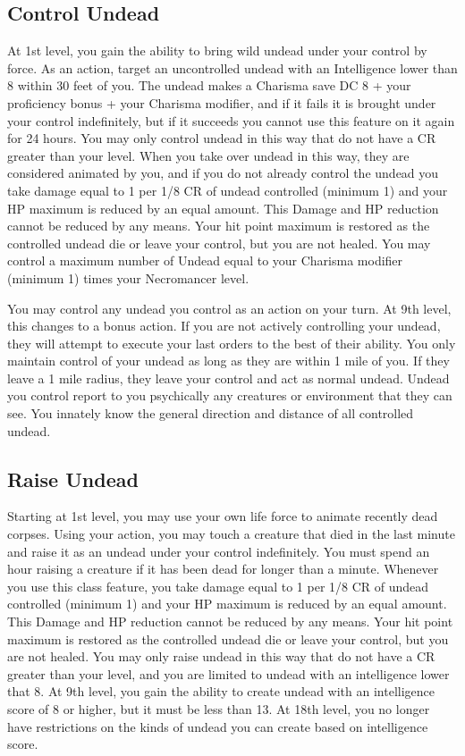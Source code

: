 \subsection{Control Undead}
At 1st level, you gain the ability to bring wild undead under your control by force. As an action, target an uncontrolled undead with an Intelligence lower than 8 within 30 feet of you. The undead makes a Charisma save DC 8 + your proficiency bonus + your Charisma modifier, and if it fails it is brought under your control indefinitely, but if it succeeds you cannot use this feature on it again for 24 hours. You may only control undead in this way that do not have a CR greater than your level. When you take over undead in this way, they are considered animated by you, and if you do not already control the undead you take damage equal to 1 per 1/8 CR of undead controlled (minimum 1) and your HP maximum is reduced by an equal amount. This Damage and HP reduction cannot be reduced by any means. Your hit point maximum is restored as the controlled undead die or leave your control, but you are not healed. You may control a maximum number of Undead equal to your Charisma modifier (minimum 1) times your Necromancer level.

You may control any undead you control as an action on your turn. At 9th level, this changes to a bonus action. If you are not actively controlling your undead, they will attempt to execute your last orders to the best of their ability. You only maintain control of your undead as long as they are within 1 mile of you. If they leave a 1 mile radius, they leave your control and act as normal undead.
Undead you control report to you psychically any creatures or environment that they can see. You innately know the general direction and distance of all controlled undead.

\subsection{Raise Undead}
Starting at 1st level, you may use your own life force to animate recently dead corpses. Using your action, you may touch a creature that died in the last minute and raise it as an undead under your control indefinitely.  You must spend an hour raising a creature if it has been dead for longer than a minute. Whenever you use this class feature, you take damage equal to 1 per 1/8 CR of undead controlled (minimum 1) and your HP maximum is reduced by an equal amount. This Damage and HP reduction cannot be reduced by any means. Your hit point maximum is restored as the controlled undead die or leave your control, but you are not healed. You may only raise undead in this way that do not have a CR greater than your level, and you are limited to undead with an intelligence lower that 8. At 9th level, you gain the ability to create undead with an intelligence score of 8 or higher, but it must be less than 13. At 18th level, you no longer have restrictions on the kinds of undead you can create based on intelligence score.

